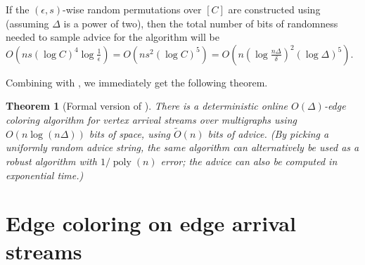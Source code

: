 \documentclass[10pt]{article}
\newtheorem{theorem}{Theorem}[section]
\theoremstyle{definition}\newtheorem{definition}[lemma]{Definition}
\theoremstyle{remark}  \newtheorem*{remark}{Remark}
\newcommand{\tO}{\widetilde{O}}
\DeclareMathOperator{\poly}{poly}
\begin{document}
If the $(\epsilon,s)$-wise random permutations over $[C]$ are constructed using  (assuming $\Delta$ is a power of two), then the total number of bits of randomness needed to sample advice for the algorithm will be $O(n s (\log C)^4 \log\frac{1}{\epsilon}) = O(n s^2 (\log C)^5) = O\left(n \left(\log \frac{n\Delta}{\delta}\right)^2 (\log \Delta)^5 \right) $.
% 


Combining  with , we immediately get the following theorem.

\begin{theorem}[Formal version of ]\label{thm:online-det-va-formal}
  There is a deterministic online $O(\Delta)$-edge coloring algorithm for vertex arrival streams over multigraphs using $O(n \log (n\Delta))$ bits of space, using $\tO(n)$ bits of advice. (By picking a uniformly random advice string, the same algorithm can alternatively be used as a robust algorithm with $1/\poly(n)$ error; the advice can also be computed in exponential time.) 
  \end{theorem}
\section{Edge coloring on edge arrival streams}
\end{document}
